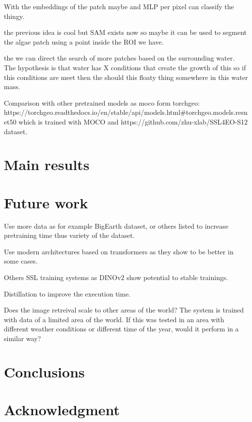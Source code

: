\documentclass[conference]{IEEEtran}
\begin{document}
    With the embeddings of the patch maybe and MLP per pixel can classify the thingy.


    the previous idea is cool but SAM exists now so maybe it can be used to segment the algae patch
    using a point inside the ROI we have.

    the we can direct the search of more patches based on the surrounding water.
    The hypothesis is that water has X conditions that create the growth of this so if this conditions
    are meet then the should this floaty thing somewhere in this water mass.


    Comparison with other pretrained models as moco form torchgeo:
    https://torchgeo.readthedocs.io/en/stable/api/models.html#torchgeo.models.resnet50 which is trained with MOCO and https://github.com/zhu-xlab/SSL4EO-S12 dataset.


    \section{Main results}


    \section{Future work}
    Use more data as for example BigEarth dataset, or others listed to increase pretraining time thus variety of the dataset.

    Use modern architectures based on transformers as they show to be better in some cases.

    Others SSL training systems as DINOv2 show potential to stable trainings.

    Distillation to improve the execution time.

    Does the image retreival scale to other areas of the world? The system is trained with data of a limited area of the world.
    If this was tested in an area with different weather conditions or different time of the year, would it perform in a similar way?


    \section{Conclusions}

    \section*{Acknowledgment}

    
\end{document}
